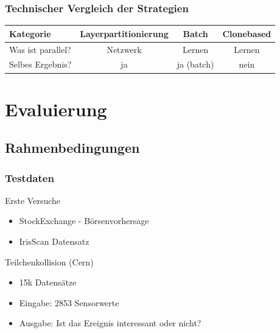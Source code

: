 \documentclass[18pt]{beamer}
\begin{document}
	\begin{frame}[c]\frametitle{Technischer Vergleich der Strategien}	
		\begin{tabular}{l|c|c|c|}

		Kategorie & Layerpartitionierung & Batch & Clonebased \\
		\hline
		Was ist parallel? & Netzwerk & Lernen & Lernen\\
		Selbes Ergebnis? & ja & ja (batch) & nein \\

		\end{tabular}
	
	\end{frame}


	\section{Evaluierung}
	\subsection{Rahmenbedingungen}
	\begin{frame}[c]\frametitle{Testdaten}
		\begin{block}{Erste Versuche}
		    \begin{itemize}
		    	\item StockExchange - Börsenvorhersage
		    	\item IrisScan Datensatz
		    \end{itemize}
		\end{block}
		\begin{block}{Teilchenkollision (Cern)}
		    \begin{itemize}
		    	\item 15k Datensätze
		    	\item Eingabe: 2853 Sensorwerte
				\item Ausgabe: Ist das Ereignis interessant oder nicht? 
		    \end{itemize}
		\end{block}		
	\end{frame}
\end{document}
